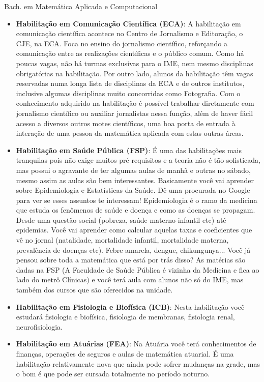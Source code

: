 \begin{subsecao}{Bach. em Matemática Aplicada e Computacional}
\begin{itemize}
    onde a estatística aparece e é estudada, mesmo que sem tanta formalidade. É
    meio que um meio termo entre estatística e economia.
  \item \textbf{Habilitação em Comunicação Científica (ECA)}: A habilitação em
    comunicação científica acontece no Centro de Jornalismo e Editoração, o CJE,
    na ECA. Foca no ensino do jornalismo científico, reforçando a comunicação
    entre as realizações científicas e o público comum. Como há poucas vagas,
    não há turmas exclusivas para o IME, nem mesmo disciplinas obrigatórias na
    habilitação. Por outro lado, alunos da habilitação têm vagas reservadas numa
    longa lista de disciplinas da ECA e de outros institutos, inclusive algumas
    disciplinas muito concorridas como Fotografia. Com o conhecimento adquirido
    na habilitação é possível trabalhar diretamente com jornalismo científico ou
    auxiliar jornalistas nessa função, além de haver fácil acesso a diversos
    outros motes científicos, uma boa porta de entrada à interação de uma pessoa
    da matemática aplicada com estas outras áreas.
  \item \textbf{Habilitação em Saúde Pública (FSP)}: É uma das habilitações mais
    tranquilas pois não exige muitos pré-requisitos e a teoria não é tão
    sofisticada, mas possui o agravante de ter algumas aulas de manhã e outras
    no sábado, mesmo assim as aulas são bem interessantes. Basicamente você vai
    aprender sobre Epidemiologia e Estatísticas da Saúde. Dê uma procurada no
    Google para ver se esses assuntos te interessam! Epidemiologia é o ramo da
    medicina que estuda os fenômenos de saúde e doença e como as doenças se
    propagam. Desde uma questão social (pobreza, saúde materno-infantil etc)
    até epidemias. Você vai aprender como calcular aquelas taxas e coeficientes
    que vê no jornal (natalidade, mortalidade infantil, mortalidade materna,
    prevalência de doenças etc). Febre amarela, dengue, chikungunya... Você já
    pensou sobre toda a matemática que está por trás disso? As matérias são dadas na
    FSP (A Faculdade de Saúde Pública é vizinha da Medicina e fica ao lado do
    metrô Clínicas) e você terá aula com alunos não só do IME, mas também dos
    cursos que são oferecidos na unidade.
  \item \textbf{Habilitação em Fisiologia e Biofísica (ICB)}:
    Nesta habilitação você estudará fisiologia e biofísica, fisiologia de
    membranas, fisiologia renal, neurofisiologia.
\pagebreak
  \item \textbf{Habilitação em Atuárias (FEA)}:
   Na Atuária você terá conhecimentos de finanças, operações de seguros e aulas de matemática atuarial. 
   É uma habilitação relativamente nova que ainda pode sofrer mudanças na grade, mas o bom é que 
   pode ser cursada totalmente no período noturno.
\end{itemize}


\end{subsecao}
